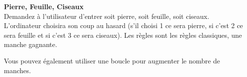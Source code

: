\newpage
\begin{Exercice}[20 minutes] \textbf{Pierre, Feuille, Ciseaux \optionnel}\\
  Demandez à l'utilisateur d'entrer soit pierre, soit feuille, soit ciseaux. L'ordinateur choisira son coup au hasard (s'il choisi 1 ce sera pierre, si c'est 2 ce sera feuille et si c'est 3 ce sera ciseaux). Les règles sont les règles classiques, une manche gagnante.   \\
  
  
   
    \begin{solution}
    
    
    
    Vous pouvez également utiliser une boucle pour augmenter le nombre de manches. \\
           
    \end{solution}   
\end{Exercice}



